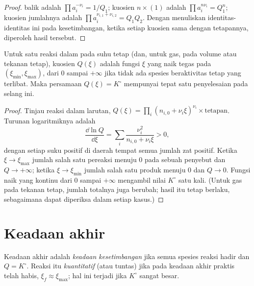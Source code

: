 \begin{proof}
 balik adalah $\prod a_i^{-\nu_i} = 1/Q_1$; kuosien
$n \times (1)$ adalah $\prod a_i^{n\nu_i} = Q_1^n$; kuosien jumlahnya adalah
$\prod a_i^{\nu_{i,1} + \nu_{i,2}} = Q_1 Q_2$. Dengan menuliskan
identitas-identitas ini pada kesetimbangan, ketika setiap kuosien sama
dengan tetapannya, diperoleh hasil tersebut.
\end{proof}

\begin{proposition}\label{prop:b1:extent-q-and-k:q-monotone}
Untuk satu reaksi dalam  pada suhu tetap (dan, untuk gas,
pada volume atau tekanan tetap), kuosien $Q(\xi)$ adalah fungsi $\xi$
yang naik tegas pada $(\xi_{\min}, \xi_{\max})$, dari 0 sampai $+\infty$
jika tidak ada spesies beraktivitas tetap yang terlibat. Maka persamaan
$Q(\xi) = K^\circ$ mempunyai tepat satu penyelesaian pada selang ini.
\end{proposition}

\begin{proof}
Tinjau reaksi dalam larutan, $Q(\xi) = \prod_i (n_{i,0} + \nu_i\xi)^{\nu_i}
\times \text{tetapan}$. Turunan logaritmiknya adalah
\[
  \frac{\dd \ln Q}{\dd \xi} = \sum_i \frac{\nu_i^2}{n_{i,0} + \nu_i \xi}
  > 0 ,
\]
dengan setiap suku positif di daerah tempat semua jumlah zat positif.
Ketika $\xi \to \xi_{\max}$ jumlah salah satu pereaksi menuju 0 pada
sebuah penyebut dan $Q \to +\infty$; ketika $\xi
\to \xi_{\min}$ jumlah salah satu produk menuju 0 dan $Q \to 0$. Fungsi
naik yang kontinu dari 0 sampai $+\infty$ mengambil nilai $K^\circ$ satu
kali. (Untuk gas pada tekanan tetap, jumlah totalnya juga berubah; hasil
itu tetap berlaku, sebagaimana dapat diperiksa dalam setiap kasus.)
\end{proof}

\section{Keadaan akhir}

\begin{definition}\label{def:b1:extent-q-and-k:quantitative}
Keadaan akhir adalah
\emph{keadaan kesetimbangan} jika semua spesies reaksi hadir dan $Q = K^\circ$. Reaksi
itu \emph{kuantitatif} (atau tuntas) jika pada
keadaan akhir  praktis telah habis,
$\xi_f \approx \xi_{\max}$; hal ini terjadi jika $K^\circ$ sangat besar.
\end{definition}

